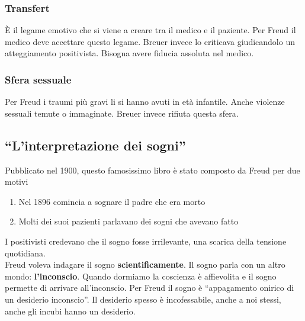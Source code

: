 \subsubsection{Transfert}
È il legame emotivo che si viene a creare tra il medico e il paziente. Per Freud il medico deve 
accettare questo legame. Breuer invece lo criticava giudicandolo un atteggiamento positivista. 
Bisogna avere fiducia assoluta nel medico.

\subsubsection{Sfera sessuale}
Per Freud i traumi più gravi li si hanno avuti in età infantile. Anche violenze sessuali temute o
immaginate. Breuer invece rifiuta questa sfera.

\subsection{``L'interpretazione dei sogni''}
Pubblicato nel 1900, questo famosissimo libro è stato composto da Freud per due motivi
\begin{enumerate}
  \item Nel 1896 comincia a sognare il padre che era morto
  \item Molti dei suoi pazienti parlavano dei sogni che avevano fatto
\end{enumerate}
I positivisti credevano che il sogno fosse irrilevante, una scarica della tensione quotidiana.\\
Freud voleva indagare il sogno \textbf{scientificamente}. Il sogno parla con un altro mondo:
\textbf{l'inconscio}. Quando dormiamo la coscienza è affievolita e il sogno permette di arrivare
all'inconscio. Per Freud il sogno è ``appagamento onirico di un desiderio inconscio''. Il desiderio
spesso è incofessabile, anche a noi stessi, anche gli incubi hanno un desiderio.

